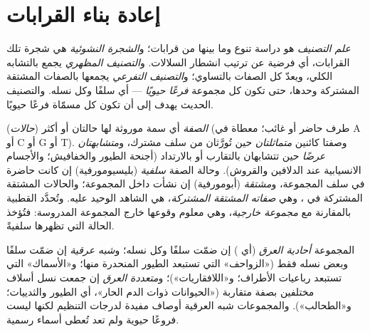 \section{إعادة بناء القرابات}

\begin{definition}\label{def:b1:classifying-biodiversity:systematics}
\emph{علم التصنيف} هو دراسة تنوع  وما
بينها من قرابات؛ و\emph{الشجرة النشوئية} هي شجرة تلك
القرابات، أي فرضية عن ترتيب انشطار السلالات.
و\emph{التصنيف المظهري} يجمع  بالتشابه الكلي، ويعدّ كل
الصفات بالتساوي؛ و\emph{التصنيف التفرعي} يجمعها بالصفات المشتقة
المشتركة وحدها، حتى تكون كل مجموعة \emph{فرعًا حيويًا} --- أي سلفًا
وكل نسله. والتصنيف الحديث يهدف إلى أن تكون كل  مسمّاة فرعًا حيويًا.
\end{definition}

\begin{definition}\label{def:b1:classifying-biodiversity:characters}
\emph{الصفة} أي سمة موروثة لها حالتان أو أكثر
(\emph{حالات}) (طرف حاضر أو غائب؛  معطاة في  A أو C أو G
أو T). وصفتا كائنين \emph{متماثلتان} حين تُورَّثان
من سلف مشترك، و\emph{متشابهتان عرضًا} حين تتشابهان بالتقارب
أو بالارتداد (أجنحة الطيور والخفافيش؛ والأجسام الانسيابية عند
الدلافين والقروش). وحالة الصفة \emph{سلفية}
(بليسيومورفية) إن كانت حاضرة في سلف المجموعة، و\emph{مشتقة}
(أبومورفية) إن نشأت داخل المجموعة؛ والحالات المشتقة المشتركة
في ، وهي \emph{صفاته المشتقة المشتركة}، هي الشاهد الوحيد عليه.
وتُحدَّد القطبية بالمقارنة مع \emph{مجموعة خارجية}، وهي 
معلوم وقوعها خارج المجموعة المدروسة: فتُؤخذ الحالة التي تظهرها
سلفيةً.
\end{definition}

\begin{definition}\label{def:b1:classifying-biodiversity:monophyly}
المجموعة \emph{أحادية العرق} (أي ) إن ضمّت سلفًا
وكل نسله؛ و\emph{شبه عرقية} إن ضمّت
سلفًا وبعض نسله فقط («الزواحف» التي
تستبعد الطيور المنحدرة منها؛ و«الأسماك» التي تستبعد
رباعيات الأطراف؛ و«اللافقاريات»)؛ و\emph{متعددة العرق} إن جمعت
نسل أسلاف مختلفين بصفة متقاربة («الحيوانات
ذوات الدم الحار»، أي الطيور والثدييات؛ و«الطحالب»). والمجموعات شبه العرقية
أوصاف مفيدة لدرجات التنظيم لكنها ليست
فروعًا حيوية ولم تعد تُعطى أسماء رسمية.
\end{definition}

